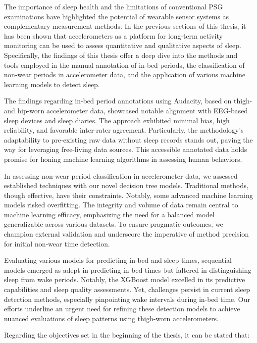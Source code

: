 \documentclass[
  10pt,
]{scrbook}
\begin{document}
The importance of sleep health and the limitations of conventional PSG
examinations have highlighted the potential of wearable sensor systems
as complementary measurement methods. In the previous sections of this
thesis, it has been shown that accelerometers as a platform for
long-term activity monitoring can be used to assess quantitative and
qualitative aspects of sleep. Specifically, the findings of this thesis
offer a deep dive into the methods and tools employed in the manual
annotation of in-bed periods, the classification of non-wear periods in
accelerometer data, and the application of various machine learning
models to detect sleep.

The findings regarding in-bed period annotations using Audacity, based
on thigh- and hip-worn accelerometer data, showcased notable alignment
with EEG-based sleep devices and sleep diaries. The approach exhibited
minimal bias, high reliability, and favorable inter-rater agreement.
Particularly, the methodology's adaptability to pre-existing raw data
without sleep records stands out, paving the way for leveraging
free-living data sources. This accessible annotated data holds promise
for honing machine learning algorithms in assessing human behaviors.

In assessing non-wear period classification in accelerometer data, we
assessed established techniques with our novel decision tree models.
Traditional methods, though effective, have their constraints. Notably,
some advanced machine learning models risked overfitting. The integrity
and volume of data remain central to machine learning efficacy,
emphasizing the need for a balanced model generalizable across various
datasets. To ensure pragmatic outcomes, we champion external validation
and underscore the imperative of method precision for initial non-wear
time detection.

Evaluating various models for predicting in-bed and sleep times,
sequential models emerged as adept in predicting in-bed times but
faltered in distinguishing sleep from wake periods. Notably, the XGBoost
model excelled in its predictive capabilities and sleep quality
assessments. Yet, challenges persist in current sleep detection methods,
especially pinpointing wake intervals during in-bed time. Our efforts
underline an urgent need for refining these detection models to achieve
nuanced evaluations of sleep patterns using thigh-worn accelerometers.

Regarding the objectives set in the beginning of the thesis, it can be
stated that:
\end{document}
